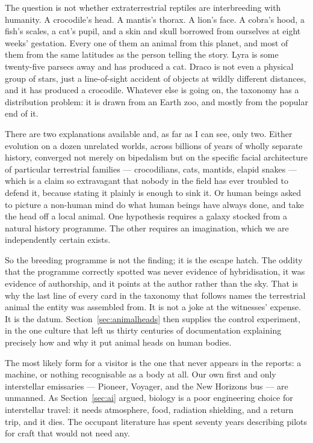 The question is not whether extraterrestrial reptiles are interbreeding with humanity.
 A crocodile's head. A mantis's
thorax. A lion's face. A cobra's hood, a fish's scales, a cat's pupil, and a skin and skull
borrowed from ourselves at eight weeks' gestation. Every one of them an animal from this
planet, and most of them from the same latitudes as the person telling the story. Lyra is some
twenty-five parsecs away and has produced a cat. Draco is not even a physical group of stars,
just a line-of-sight accident of objects at wildly different distances, and it has produced a
crocodile. Whatever else is going on, the taxonomy has a distribution problem: it is drawn from
an Earth zoo, and mostly from the popular end of it.

There are two explanations available and, as far as I can see, only two. Either evolution on a
dozen unrelated worlds, across billions of years of wholly separate history, converged not
merely on bipedalism but on the specific facial architecture of particular terrestrial
families --- crocodilians, cats, mantids, elapid snakes --- which is a claim so extravagant
that nobody in the field has ever troubled to defend it, because stating it plainly is enough
to sink it. Or human beings asked to picture a non-human mind do what human beings have always
done, and take the head off a local animal. One hypothesis requires a galaxy stocked from a
natural history programme. The other requires an imagination, which we are independently
certain exists.

So the breeding programme is not the finding; it is the escape hatch. The oddity that the
programme correctly spotted was never evidence of hybridisation, it was evidence of
authorship, and it points at the author rather than the sky. That is why the last line of every
card in the taxonomy that follows names the terrestrial animal the entity was assembled from. It
is not a joke at the witnesses' expense. It is the datum. Section~\ref{sec:animalheads} then
supplies the control experiment, in the one culture that left us thirty centuries of
documentation explaining precisely how and why it put animal heads on human bodies.

\begin{funfact}
The most likely form for a visitor is the one that never appears in the reports: a machine, or
nothing recognisable as a body at all. Our own first and only interstellar emissaries ---
Pioneer, Voyager, and the New Horizons bus --- are unmanned. As Section~\ref{sec:ai}
argued, biology is a poor engineering choice for interstellar travel: it needs atmosphere,
food, radiation shielding, and a return trip, and it dies. The occupant literature has
spent seventy years describing pilots for craft that would not need any.
\end{funfact}

